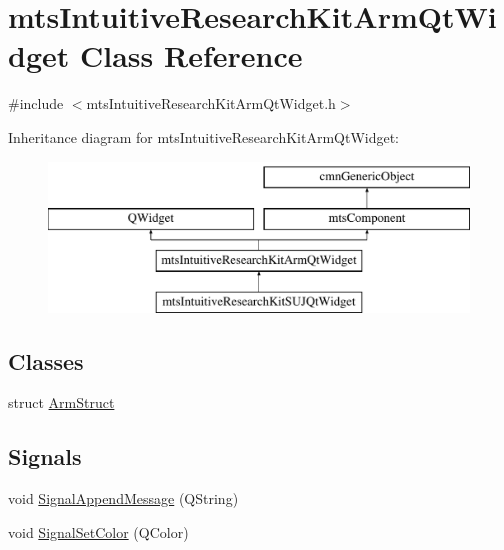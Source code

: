 \hypertarget{classmts_intuitive_research_kit_arm_qt_widget}{\section{mts\-Intuitive\-Research\-Kit\-Arm\-Qt\-Widget Class Reference}
\label{classmts_intuitive_research_kit_arm_qt_widget}
}


{\ttfamily \#include $<$mts\-Intuitive\-Research\-Kit\-Arm\-Qt\-Widget.\-h$>$}

Inheritance diagram for mts\-Intuitive\-Research\-Kit\-Arm\-Qt\-Widget\-:\begin{figure}[H]
\begin{center}
\leavevmode
\includegraphics[height=4.000000cm]{d9/d99/classmts_intuitive_research_kit_arm_qt_widget}
\end{center}
\end{figure}
\subsection*{Classes}
\begin{DoxyCompactItemize}
\item 
struct \hyperlink{structmts_intuitive_research_kit_arm_qt_widget_1_1_arm_struct}{Arm\-Struct}
\end{DoxyCompactItemize}
\subsection*{Signals}
\begin{DoxyCompactItemize}
\item 
void \hyperlink{classmts_intuitive_research_kit_arm_qt_widget_adb74dc2f4dec9467017eeef010969579}{Signal\-Append\-Message} (Q\-String)
\item 
void \hyperlink{classmts_intuitive_research_kit_arm_qt_widget_ac8d02042dcbb4d76626ba7ab1cbc6e23}{Signal\-Set\-Color} (Q\-Color)
\end{DoxyCompactItemize}
